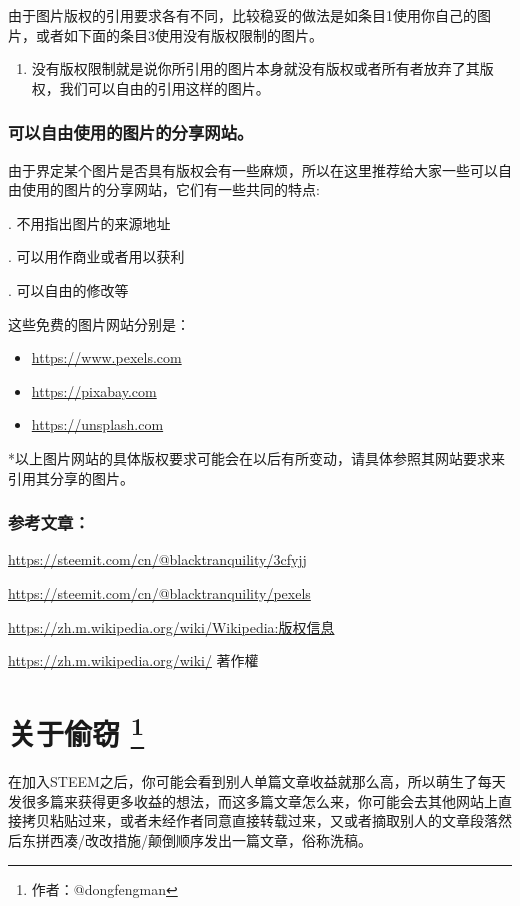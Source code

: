 \documentclass[]{ctexbook}
\providecommand{\tightlist}{%
  \setlength{\itemsep}{0pt}\setlength{\parskip}{0pt}}
\begin{document}
由于图片版权的引用要求各有不同，比较稳妥的做法是如条目1使用你自己的图片，或者如下面的条目3使用没有版权限制的图片。

\begin{enumerate}
\def\labelenumi{\arabic{enumi}.}
\setcounter{enumi}{2}
\tightlist
\item
  没有版权限制就是说你所引用的图片本身就没有版权或者所有者放弃了其版权，我们可以自由的引用这样的图片。
\end{enumerate}

\subsubsection{可以自由使用的图片的分享网站。}

由于界定某个图片是否具有版权会有一些麻烦，所以在这里推荐给大家一些可以自由使用的图片的分享网站，它们有一些共同的特点:

. 不用指出图片的来源地址

. 可以用作商业或者用以获利

. 可以自由的修改等

这些免费的图片网站分别是：

\begin{itemize}
\item
  \url{https://www.pexels.com}
\item
  \url{https://pixabay.com}
\item
  \url{https://unsplash.com}
\end{itemize}

*以上图片网站的具体版权要求可能会在以后有所变动，请具体参照其网站要求来引用其分享的图片。

\subsubsection{参考文章：}

\url{https://steemit.com/cn/@blacktranquility/3cfyjj}

\url{https://steemit.com/cn/@blacktranquility/pexels}

\url{https://zh.m.wikipedia.org/wiki/Wikipedia:版权信息}

\url{https://zh.m.wikipedia.org/wiki/}
著作權

\section[关于偷窃 ]{\texorpdfstring{关于偷窃 \footnote{作者：@dongfengman}}{关于偷窃 }}

在加入STEEM之后，你可能会看到别人单篇文章收益就那么高，所以萌生了每天发很多篇来获得更多收益的想法，而这多篇文章怎么来，你可能会去其他网站上直接拷贝粘贴过来，或者未经作者同意直接转载过来，又或者摘取别人的文章段落然后东拼西凑/改改措施/颠倒顺序发出一篇文章，俗称洗稿。
\end{document}
